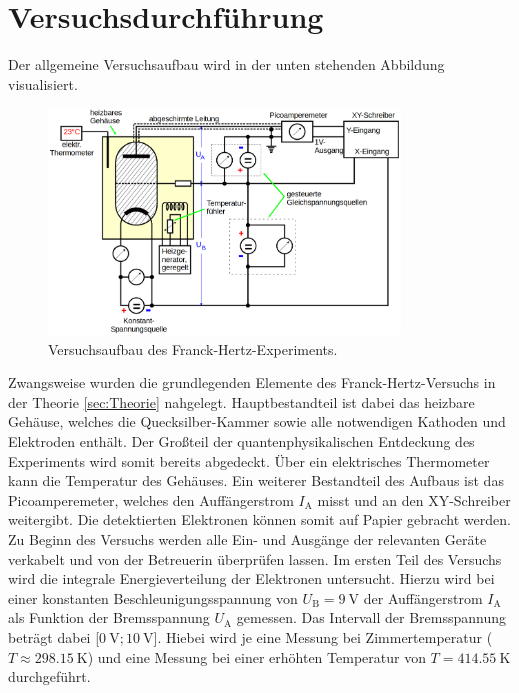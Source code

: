 



\section{Versuchsdurchführung}

Der allgemeine Versuchsaufbau wird in der unten stehenden Abbildung visualisiert.

\begin{figure}
    \centering
    \includegraphics[height=6cm]{Aufbau.png}
    \caption{Versuchsaufbau des Franck-Hertz-Experiments\cite{Versuchsanleitung_v601}.}
    \label{fig:Aufbau}
\end{figure}

\noindent Zwangsweise wurden die grundlegenden Elemente des Franck-Hertz-Versuchs in der Theorie \ref{sec:Theorie} nahgelegt. Hauptbestandteil ist dabei 
das heizbare Gehäuse, welches die Quecksilber-Kammer sowie alle notwendigen Kathoden und Elektroden enthält. Der Großteil der quantenphysikalischen Entdeckung 
des Experiments wird somit bereits abgedeckt. Über ein elektrisches Thermometer kann die Temperatur des Gehäuses. Ein weiterer Bestandteil des Aufbaus ist 
das Picoamperemeter, welches den Auffängerstrom $I_\text{A}$ misst und an den XY-Schreiber weitergibt. Die detektierten Elektronen können somit auf Papier 
gebracht werden.\\

\noindent Zu Beginn des Versuchs werden alle Ein- und Ausgänge der relevanten Geräte verkabelt und von der Betreuerin überprüfen lassen. Im ersten Teil des Versuchs wird 
die integrale Energieverteilung der Elektronen untersucht. Hierzu wird bei einer konstanten Beschleunigungsspannung von $U_\text{B} = \qty{9}{\volt}$ der 
Auffängerstrom $I_\text{A}$ als Funktion der Bremsspannung $U_\text{A}$ gemessen. Das Intervall der Bremsspannung beträgt dabei [$\qty{0}{\volt};\qty{10}{\volt}$]. 
Hiebei wird je eine Messung bei Zimmertemperatur ($T \approx \qty{298.15}{\kelvin}$) und eine Messung bei einer erhöhten Temperatur von $T = \qty{414.55}{\kelvin}$
durchgeführt.\\

